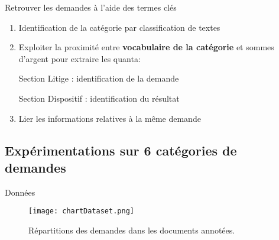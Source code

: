 \begin{frame}[c]{Retrouver les demandes à l'aide des termes clés}
	\begin{enumerate} \scriptsize
		\item Identification de la catégorie par classification de textes 
		\item Exploiter la proximité entre \textbf{vocabulaire de la catégorie} et sommes d’argent pour extraire les quanta:
		
		Section Litige : identification de la demande
		
	
	Section Dispositif : identification du résultat
		\item Lier les informations relatives à la même demande
	\end{enumerate}
	
\end{frame}
\subsection{Expérimentations sur 6 catégories de demandes}
\begin{frame}{Données}
	\begin{figure}[!htb]
		\texttt{[image: chartDataset.png]}
		\caption{\scriptsize Répartitions des demandes dans les documents annotées.}\label{fig:quanta:hist-repartition-docs}
	\end{figure}	
\end{frame}


